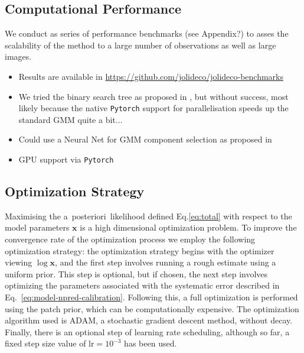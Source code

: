 \documentclass[twocolumn]{aastex631}
\newcommand{\aposteriori}{a~posteriori~}
\begin{document}
     
    \subsection{Computational Performance}
    We conduct as series of performance benchmarks (see Appendix?) to asses the scalability of the method to a large number of observations as well as large images. 

    \begin{itemize}
        \item Results are available in \url{https://github.com/jolideco/jolideco-benchmarks}
        \item We tried the binary search tree as proposed in \cite{Parameswaran2018},
        but without success, most likely because the native \texttt{Pytorch} support
        for parallelisation speeds up the standard GMM quite a bit...
        \item Could use a Neural Net for GMM component selection as proposed in \cite{Rosenbaum15}
        \item GPU support via \texttt{Pytorch}

    \end{itemize}

    \subsection{Optimization Strategy}
    Maximising the \aposteriori likelihood defined Eq.\ref{eq:total} with respect to the model parameters $\mathbf{x}$ is a high dimensional optimization problem. To improve the convergence rate of the optimization process we employ the following optimization strategy: the optimization strategy begins with the optimizer viewing $\log{\mathbf{x}}$, and the first step involves running a rough estimate using a uniform prior. This step is optional, but if chosen, the next step involves optimizing the parameters associated with the systematic error described in Eq.~\ref{eq:model-npred-calibration}. Following this, a full optimization is performed using the patch prior, which can be computationally expensive. The optimization algorithm used is ADAM, a stochastic gradient descent method, without decay. Finally, there is an optional step of learning rate scheduling, although so far, a fixed step size value of $\mathrm{lr}=10^{-3}$ has been used.
    
\end{document}
